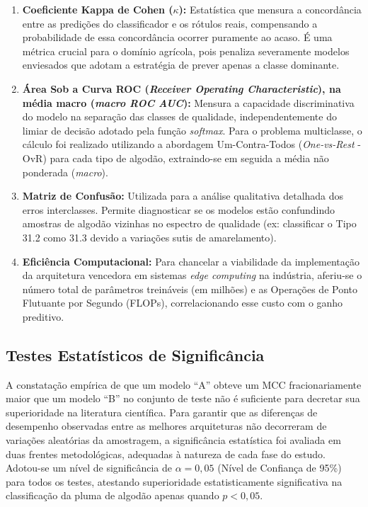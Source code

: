 \begin{enumerate}
        \item \textbf{Coeficiente Kappa de Cohen ($\kappa$):} Estatística que mensura a concordância entre as predições do classificador e os rótulos reais, compensando a probabilidade de essa concordância ocorrer puramente ao acaso. É uma métrica crucial para o domínio agrícola, pois penaliza severamente modelos enviesados que adotam a estratégia de prever apenas a classe dominante.
        
        \item \textbf{Área Sob a Curva ROC (\textit{Receiver Operating Characteristic}), na média macro (\textit{macro ROC AUC}):} Mensura a capacidade discriminativa do modelo na separação das classes de qualidade, independentemente do limiar de decisão adotado pela função \textit{softmax}. Para o problema multiclasse, o cálculo foi realizado utilizando a abordagem Um-Contra-Todos (\textit{One-vs-Rest} - OvR) para cada tipo de algodão, extraindo-se em seguida a média não ponderada (\textit{macro}).
        
        \item \textbf{Matriz de Confusão:} Utilizada para a análise qualitativa detalhada dos erros interclasses. Permite diagnosticar se os modelos estão confundindo amostras de algodão vizinhas no espectro de qualidade (ex: classificar o Tipo 31.2 como 31.3 devido a variações sutis de amarelamento).
        
        \item \textbf{Eficiência Computacional:} Para chancelar a viabilidade da implementação da arquitetura vencedora em sistemas \textit{edge computing} na indústria, aferiu-se o número total de parâmetros treináveis (em milhões) e as Operações de Ponto Flutuante por Segundo (FLOPs), correlacionando esse custo com o ganho preditivo.
    \end{enumerate}

\subsection{Testes Estatísticos de Significância}

    A constatação empírica de que um modelo ``A'' obteve um MCC fracionariamente maior que um modelo ``B'' no conjunto de teste não é suficiente para decretar sua superioridade na literatura científica. Para garantir que as diferenças de desempenho observadas entre as melhores arquiteturas não decorreram de variações aleatórias da amostragem, a significância estatística foi avaliada em duas frentes metodológicas, adequadas à natureza de cada fase do estudo. Adotou-se um nível de significância de $\alpha = 0,05$ (Nível de Confiança de 95\%) para todos os testes, atestando superioridade estatisticamente significativa na classificação da pluma de algodão apenas quando $p < 0,05$.



